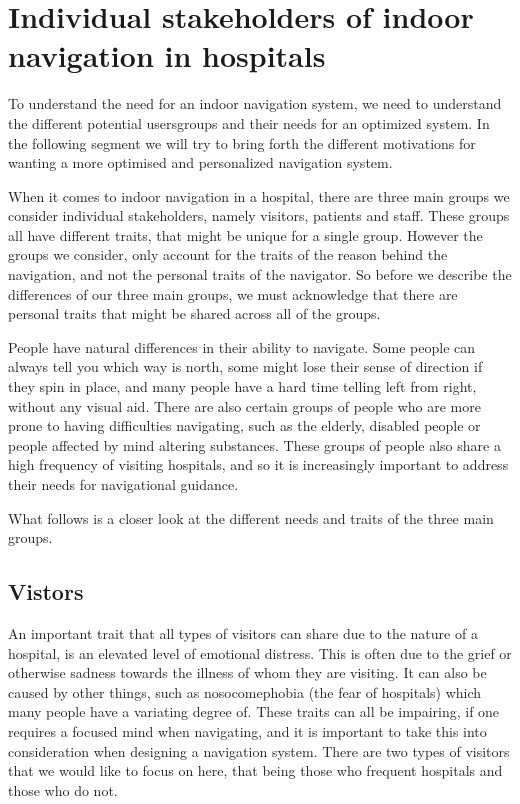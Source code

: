 \section{Individual stakeholders of indoor navigation in hospitals} %
\label{sec:interusers}

To understand the need for an indoor navigation system, we need to understand the different potential usersgroups and their needs for an optimized system. In the following segment we will try to bring forth the different motivations for wanting a more optimised and personalized navigation system.

When it comes to indoor navigation in a hospital, there are three main groups we consider individual stakeholders, namely visitors, patients and staff. These groups all have different traits, that might be unique for a single group. However the groups we consider, only account for the traits of the reason behind the navigation, and not the personal traits of the navigator. So before we describe the differences of our three main groups, we must acknowledge that there are personal traits that might be shared across all of the groups.

People have natural differences in their ability to navigate. Some people can always tell you which way is north, some might lose their sense of direction if they spin in place, and many people have a hard time telling left from right, without any visual aid. There are also certain groups of people who are more prone to having difficulties navigating, such as the elderly, disabled people or people affected by mind altering substances. These groups of people also share a high frequency of visiting hospitals, and so it is increasingly important to address their needs for navigational guidance.

What follows is a closer look at the different needs and traits of the three main groups.

\subsection{Vistors} %
 \label{par:vistors}
 

An important trait that all types of visitors can share due to the nature of a hospital, is an elevated level of emotional distress. This is often due to the grief or otherwise sadness towards the illness of whom they are visiting. It can also be caused by other things, such as nosocomephobia (the fear of hospitals) which many people have a variating degree of. These traits can all be impairing, if one requires a focused mind when navigating, and it is important to take this into consideration when designing a navigation system. There are two types of visitors that we would like to focus on here, that being those who frequent hospitals and those who do not.

